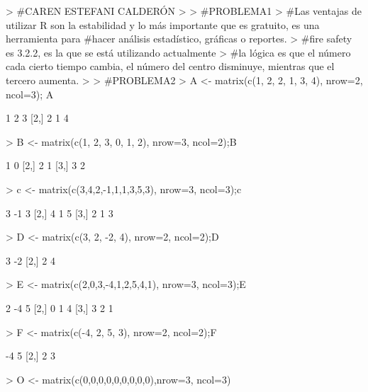 \documentclass{article}
\begin{document}


\begin{Schunk}
\begin{Sinput}
> #CAREN ESTEFANI CALDERÓN
> 
> #PROBLEMA1
> #Las ventajas de utilizar R son  la estabilidad y lo más importante que es gratuito, es una herramienta para #hacer análisis estadístico, gráficas o reportes.
> #fire safety es 3.2.2, es la que se está utilizando actualmente
> #la lógica es que el número cada cierto tiempo cambia, el número del centro disminuye, mientras que el tercero  aumenta.
> 
> #PROBLEMA2
> A <- matrix(c(1, 2, 2, 1, 3, 4), nrow=2, ncol=3); A
\end{Sinput}
\begin{Soutput}
     [,1] [,2] [,3]
[1,]    1    2    3
[2,]    2    1    4
\end{Soutput}
\begin{Sinput}
> B <- matrix(c(1, 2, 3, 0, 1, 2), nrow=3, ncol=2);B
\end{Sinput}
\begin{Soutput}
     [,1] [,2]
[1,]    1    0
[2,]    2    1
[3,]    3    2
\end{Soutput}
\begin{Sinput}
> c <- matrix(c(3,4,2,-1,1,1,3,5,3), nrow=3, ncol=3);c
\end{Sinput}
\begin{Soutput}
     [,1] [,2] [,3]
[1,]    3   -1    3
[2,]    4    1    5
[3,]    2    1    3
\end{Soutput}
\begin{Sinput}
> D <- matrix(c(3, 2, -2, 4), nrow=2, ncol=2);D
\end{Sinput}
\begin{Soutput}
     [,1] [,2]
[1,]    3   -2
[2,]    2    4
\end{Soutput}
\begin{Sinput}
> E <- matrix(c(2,0,3,-4,1,2,5,4,1), nrow=3, ncol=3);E
\end{Sinput}
\begin{Soutput}
     [,1] [,2] [,3]
[1,]    2   -4    5
[2,]    0    1    4
[3,]    3    2    1
\end{Soutput}
\begin{Sinput}
> F <- matrix(c(-4, 2, 5, 3), nrow=2, ncol=2);F
\end{Sinput}
\begin{Soutput}
     [,1] [,2]
[1,]   -4    5
[2,]    2    3
\end{Soutput}
\begin{Sinput}
> O <- matrix(c(0,0,0,0,0,0,0,0,0),nrow=3, ncol=3)

\end{Sinput}
\end{Schunk}
\end{document}
